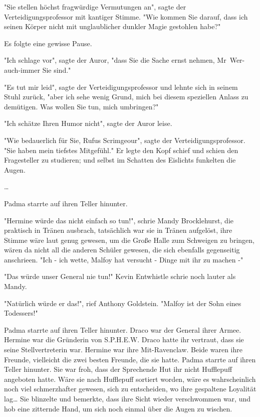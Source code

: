 {"Sie stellen höchst fragwürdige Vermutungen an", sagte der Verteidigungsprofessor mit kantiger Stimme. "Wie kommen Sie darauf, dass ich seinen Körper nicht mit unglaublicher dunkler Magie gestohlen habe?"

Es folgte eine gewisse Pause.

"Ich schlage vor", sagte der Auror, "dass Sie die Sache ernst nehmen, Mr~Wer-auch-immer Sie sind."

"Es tut mir leid", sagte der Verteidigungsprofessor und lehnte sich in seinem Stuhl zurück, "aber ich sehe wenig Grund, mich bei diesem speziellen Anlass zu demütigen. Was wollen Sie tun, mich umbringen?"

"Ich schätze Ihren Humor nicht", sagte der Auror leise.

"Wie bedauerlich für Sie, Rufus Scrimgeour", sagte der Verteidigungsprofessor. "Sie haben mein tiefstes Mitgefühl." Er legte den Kopf schief und schien den Fragesteller zu studieren; und selbst im Schatten des Eislichts funkelten die Augen.

…

Padma starrte auf ihren Teller hinunter.

"Hermine würde das nicht einfach so tun!", schrie Mandy Brocklehurst, die praktisch in Tränen ausbrach, tatsächlich war sie in Tränen aufgelöst, ihre Stimme wäre laut genug gewesen, um die Große Halle zum Schweigen zu bringen, wären da nicht all die anderen Schüler gewesen, die sich ebenfalls gegenseitig anschrieen. "Ich - ich wette, Malfoy hat versucht - Dinge mit ihr zu machen -"

"Das würde unser General nie tun!" Kevin Entwhistle schrie noch lauter als Mandy.

"Natürlich würde er das!", rief Anthony Goldstein. "Malfoy ist der Sohn eines Todessers!"

Padma starrte auf ihren Teller hinunter. Draco war der General ihrer Armee. Hermine war die Gründerin von S.P.H.E.W. Draco hatte ihr vertraut, dass sie seine Stellvertreterin war. Hermine war ihre Mit-Ravenclaw. Beide waren ihre Freunde, vielleicht die zwei besten Freunde, die sie hatte. Padma starrte auf ihren Teller hinunter. Sie war froh, dass der Sprechende Hut ihr nicht Hufflepuff angeboten hatte. Wäre sie nach Hufflepuff sortiert worden, wäre es wahrscheinlich noch viel schmerzhafter gewesen, sich zu entscheiden, wo ihre gespaltene Loyalität lag… Sie blinzelte und bemerkte, dass ihre Sicht wieder verschwommen war, und hob eine zitternde Hand, um sich noch einmal über die Augen zu wischen.

}
